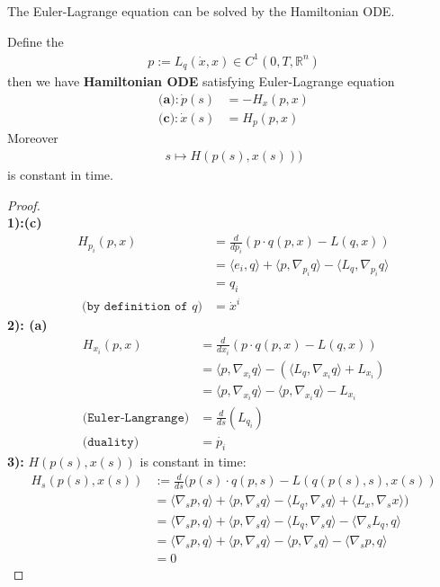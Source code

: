 The Euler-Lagrange equation can be solved by the Hamiltonian ODE. 

\begin{theorem}
Define the 
\begin{align*}
	p:= L_q(\dot{x}, x) \in C^1(0, T, \mathbb{R}^n)
\end{align*}
then we have \textbf{Hamiltonian ODE} satisfying Euler-Lagrange equation
\begin{align*}
\textbf{(a)}: \dot{p}(s) &= - H_x(p, x) \\
\textbf{(c)}: \dot{x}(s) &= H_p(p, x)	
\end{align*}
Moreover
\begin{align*}
	s \mapsto H(p(s), x(s)))
\end{align*}
is constant in time.
\end{theorem}
\begin{proof}\quad\\
\textbf{1):(c)}
\begin{align*}
	H_{p_i}(p, x) &= \frac{d}{dp_i}(p \cdot q(p, x) - L(q, x))\\
	&= \langle e_i, q \rangle + \langle p, \nabla_{p_i} q \rangle - \langle L_q, \nabla_{p_i} q \rangle \\
	&= q_i \\
	\texttt{ (by definition of $q$)}
	&= \dot{x}^i 
\end{align*}
\textbf{2): (a)}
\begin{align*}
	 H_{x_i}(p, x) &= \frac{d}{dx_i}(p \cdot q(p, x) - L(q, x))\\
	&=  \langle p,  \nabla_{x_i}q \rangle - (\langle L_q, \nabla_{x_i}q \rangle + L_{x_i}) \\
	&= \langle p,  \nabla_{x_i}q \rangle - \langle p, \nabla_{x_i} q \rangle - L_{x_i} \\
	\texttt{(Euler-Langrange)}&= \frac{d}{ds}(L_{q_i})  \\
	 \texttt{(duality) }&= \dot{p_i} 
\end{align*}
\textbf{3):} $H(p(s), x(s))$ is constant in time:
\begin{align*}
	H_s(p(s), x(s)) &:= \frac{d}{ds}(p(s) \cdot q(p, s) - L(q(p(s), s), x(s))\\
	&= \langle \nabla_s p , q \rangle  + \langle p, \nabla_s q \rangle 
	- \langle L_q , \nabla_s q \rangle + \langle L_x, \nabla_s x \rangle)\\
	&= \langle \nabla_s p , q \rangle  + \langle p, \nabla_s q \rangle
	-\langle L_q , \nabla_s q \rangle -  \langle \nabla_s L_q , q \rangle\\
	&= \langle \nabla_s p , q \rangle  + \langle p, \nabla_s q \rangle
	-\langle p , \nabla_s q \rangle - \langle \nabla_s p , q \rangle \\
	&= 0
\end{align*}

\end{proof}

